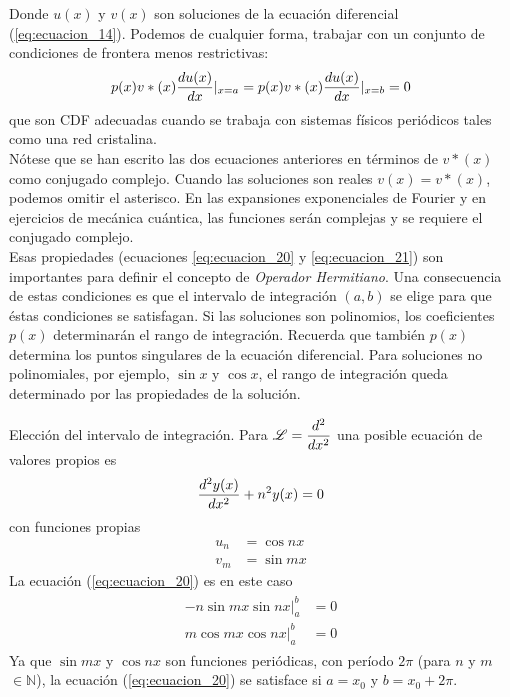 Donde $u(x)$ y $v(x)$ son soluciones de la ecuación diferencial (\ref{eq:ecuacion_14}). Podemos de cualquier forma, trabajar con un conjunto de condiciones de frontera menos restrictivas:
\begin{equation}
p(x) v*(x) \dfrac{d {u(x)}}{d x} \vert_{x = a} = p(x) v*(x) \dfrac{d {u(x)}}{d x} \vert_{x = b} = 0
\label{eq:ecuacion_21}
\end{equation}
que son CDF adecuadas cuando se trabaja con sistemas físicos periódicos tales como una red cristalina.
\\
Nótese que se han escrito las dos ecuaciones anteriores en términos de $v*(x)$ como conjugado complejo. Cuando las soluciones son reales $v(x) = v*(x)$, podemos omitir el asterisco. En las expansiones exponenciales de Fourier y en ejercicios de mecánica cuántica, las funciones serán complejas y se requiere el conjugado complejo.
\\
Esas propiedades (ecuaciones \ref{eq:ecuacion_20} y \ref{eq:ecuacion_21}) son importantes para definir el concepto de \emph{Operador Hermitiano}. Una consecuencia de estas condiciones es que el intervalo de integración $(a,b)$ se elige para que éstas condiciones se satisfagan. Si las soluciones son polinomios, los coeficientes $p(x)$ determinarán el rango de integración. Recuerda que también $p(x)$ determina los puntos singulares de la ecuación diferencial. Para soluciones no  polinomiales, por ejemplo, $\sin x$ y $\cos x$, el rango de integración queda determinado por las propiedades de la solución.
\begin{ejemplo}{Elección del intervalo de integración.}
Para $\mathscr{L} = \dfrac{d^{2} }{d x^{2}}$ una posible ecuación de valores propios es
\begin{equation}
\dfrac{d^{2} y(x)}{d x^{2}} + n^{2} y(x) = 0
\label{eq:ecuacion_22}
\end{equation}
con funciones propias
\begin{equation}
\begin{split}
u_{n} &= \cos nx \\
v_{m} &= \sin mx
\end{split}
\label{eq:ecuacion_23}
\end{equation}
La ecuación (\ref{eq:ecuacion_20}) es en este caso
\begin{eqnarray}
\begin{aligned}
- n \sin mx \sin nx \vert^{b}_{a} &= 0 \\
m \cos mx \cos nx \vert^{b}_{a} &= 0 
\end{aligned}
\label{eq:ecuacion_24}
\end{eqnarray}
Ya que $\sin mx$ y $\cos nx$ son funciones periódicas, con período $2 \pi$ (para $n$ y $m$ $\in \mathbb{N}$), la ecuación (\ref{eq:ecuacion_20}) se satisface si $a = x_{0}$ y $b =  x_{0} + 2 \pi$.
\end{ejemplo}
